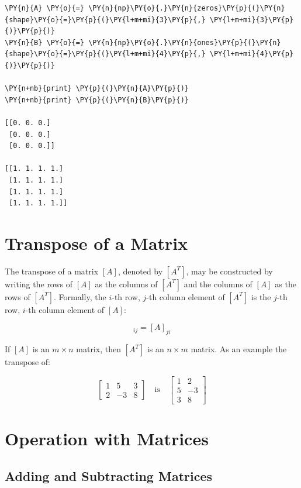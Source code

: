 \begin{tcolorbox}[breakable, size=fbox, boxrule=1pt, pad at break*=1mm,colback=cellbackground, colframe=cellborder]
\begin{Verbatim}[commandchars=\\\{\}]
\PY{n}{A} \PY{o}{=} \PY{n}{np}\PY{o}{.}\PY{n}{zeros}\PY{p}{(}\PY{n}{shape}\PY{o}{=}\PY{p}{(}\PY{l+m+mi}{3}\PY{p}{,} \PY{l+m+mi}{3}\PY{p}{)}\PY{p}{)}
\PY{n}{B} \PY{o}{=} \PY{n}{np}\PY{o}{.}\PY{n}{ones}\PY{p}{(}\PY{n}{shape}\PY{o}{=}\PY{p}{(}\PY{l+m+mi}{4}\PY{p}{,} \PY{l+m+mi}{4}\PY{p}{)}\PY{p}{)}

\PY{n+nb}{print} \PY{p}{(}\PY{n}{A}\PY{p}{)}
\PY{n+nb}{print} \PY{p}{(}\PY{n}{B}\PY{p}{)}

[[0. 0. 0.]
 [0. 0. 0.]
 [0. 0. 0.]]

[[1. 1. 1. 1.]
 [1. 1. 1. 1.]
 [1. 1. 1. 1.]
 [1. 1. 1. 1.]]
    \end{Verbatim}
\end{tcolorbox}

\section{Transpose of a Matrix}
The transpose of a matrix $[A]$, denoted by $[A^T]$, may be constructed by writing the rows of $[A]$ as the columns of $[A^T]$
and the columns of $[A]$ as the rows of $[A^T]$.
Formally, the $i$-th row, $j$-th column element of $[A^T]$ is the $j$-th row, $i$-th column element of $[A]$:

\begin{equation}[A^T]_{ij} = [A]_{ji}\end{equation}

If $[A]$ is an $m\times n$ matrix, then $[A^T]$ is an $n\times m$ matrix. 
As an example the transpose of:

\[
\begin{bmatrix}
1 & 5 & 3 \\
2 & -3 & 8
\end{bmatrix}
\quad \mathrm{is} \quad
\begin{bmatrix}
1 & 2 \\
5 & -3 \\
3  & 8
\end{bmatrix}
\]

\section{Operation with Matrices}
\subsection{Adding and Subtracting Matrices}\label{adding-and-subtracting-matrices}

